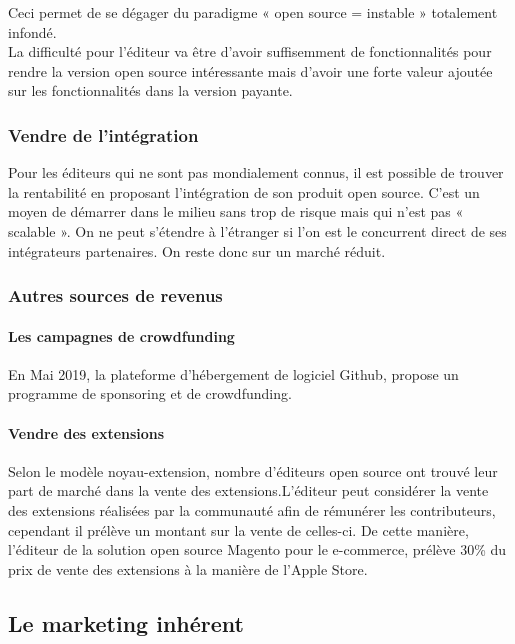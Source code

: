 					Ceci permet de se dégager du paradigme « open source = instable » totalement infondé.\\

					La difficulté pour l'éditeur va être d'avoir suffisemment de fonctionnalités pour rendre la version open source intéressante mais d'avoir une forte valeur ajoutée sur les fonctionnalités dans la version payante.

			\subsubsection{Vendre de l'intégration}

				Pour les éditeurs qui ne sont pas mondialement connus, il est possible de trouver la rentabilité en proposant l'intégration de son produit open source. C'est un moyen de démarrer dans le milieu sans trop de risque mais qui n'est pas « \gls{scalable} ». On ne peut s'étendre à l'étranger si l'on est le concurrent direct de ses intégrateurs partenaires. On reste donc sur un marché réduit.

			\subsubsection{Autres sources de revenus}

				\paragraph{Les campagnes de crowdfunding\\}

					En Mai 2019, la plateforme d'hébergement de logiciel Github, propose un programme de sponsoring et de crowdfunding.

				\paragraph{Vendre des extensions\\}

					Selon le modèle noyau-extension, nombre d'éditeurs open source ont trouvé leur part de marché dans la vente des extensions.L'éditeur peut considérer la vente des extensions réalisées par la communauté afin de rémunérer les contributeurs, cependant il prélève un montant sur la vente de celles-ci. De cette manière, l'éditeur de la solution open source Magento pour le e-commerce, prélève 30\% du prix de vente des extensions à la manière de l'Apple Store.

		\subsection{Le marketing inhérent}

